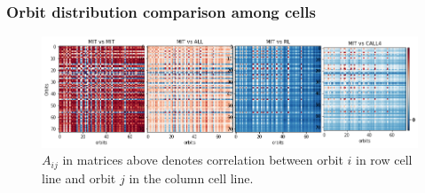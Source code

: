 \documentclass{beamer}
\begin{document}
\begin{frame}
    \frametitle{Orbit distribution comparison among cells}
    \begin{figure}[H]
        \centering
        \includegraphics[width=\textwidth]{figures/orbit_wise_correlation_chr1.png}
        \caption*{\small {$A_{ij}$ in matrices above denotes correlation between 
        orbit $i$ in row cell line and orbit $j$ in the column cell line.} }
    \end{figure}
\end{frame}

\end{document}
